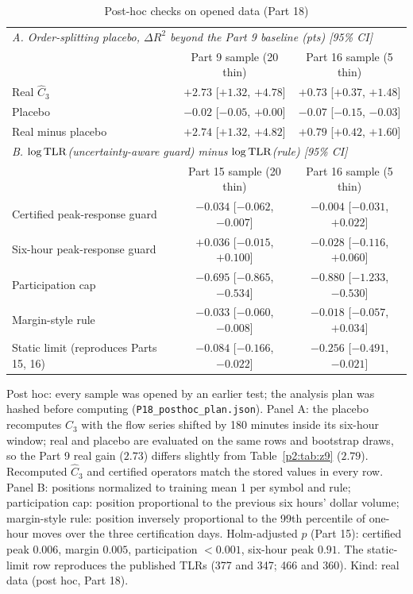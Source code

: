 \begin{table}[!tbp]\centering\small
\begin{threeparttable}
\caption{Post-hoc checks on opened data (Part 18)}\label{p2:tab:p18}
\footnotesize\setlength{\tabcolsep}{3pt}
\begin{tabular}{lcc}
\toprule
\multicolumn{3}{l}{\emph{A. Order-splitting placebo, $\Delta R^2$ beyond the Part 9 baseline (pts) [95\% CI]}}\\
 & Part 9 sample (20 thin) & Part 16 sample (5 thin)\\
\midrule
Real $\hat C_3$ & $+2.73$ [$+1.32$, $+4.78$] & $+0.73$ [$+0.37$, $+1.48$]\\
Placebo & $-0.02$ [$-0.05$, $+0.00$] & $-0.07$ [$-0.15$, $-0.03$]\\
Real minus placebo & $+2.74$ [$+1.32$, $+4.82$] & $+0.79$ [$+0.42$, $+1.60$]\\
\midrule
\multicolumn{3}{l}{\emph{B. $\log{\rm TLR}$(uncertainty-aware guard) minus $\log{\rm TLR}$(rule) [95\% CI]}}\\
 & Part 15 sample (20 thin) & Part 16 sample (5 thin)\\
\midrule
Certified peak-response guard & $-0.034$ [$-0.062$, $-0.007$] & $-0.004$ [$-0.031$, $+0.022$]\\
Six-hour peak-response guard & $+0.036$ [$-0.015$, $+0.100$] & $-0.028$ [$-0.116$, $+0.060$]\\
Participation cap & $-0.695$ [$-0.865$, $-0.534$] & $-0.880$ [$-1.233$, $-0.530$]\\
Margin-style rule & $-0.033$ [$-0.060$, $-0.008$] & $-0.018$ [$-0.057$, $+0.034$]\\
Static limit (reproduces Parts 15, 16) & $-0.084$ [$-0.166$, $-0.022$] & $-0.256$ [$-0.491$, $-0.021$]\\
\bottomrule
\end{tabular}
\begin{tablenotes}\footnotesize\item Post hoc: every sample was opened by an earlier test; the analysis plan was hashed before computing (\texttt{P18\_posthoc\_plan.json}). Panel A: the placebo recomputes $\hat C_3$ with the flow series shifted by 180 minutes inside its six-hour window; real and placebo are evaluated on the same rows and bootstrap draws, so the Part 9 real gain ($2.73$) differs slightly from Table~\ref{p2:tab:z9} ($2.79$). Recomputed $\hat C_3$ and certified operators match the stored values in every row. Panel B: positions normalized to training mean 1 per symbol and rule; participation cap: position proportional to the previous six hours' dollar volume; margin-style rule: position inversely proportional to the 99th percentile of one-hour moves over the three certification days. Holm-adjusted $p$ (Part 15): certified peak $0.006$, margin $0.005$, participation $<0.001$, six-hour peak $0.91$. The static-limit row reproduces the published TLRs (377 and 347; 466 and 360). Kind: real data (post hoc, Part 18).\end{tablenotes}
\end{threeparttable}
\end{table}

